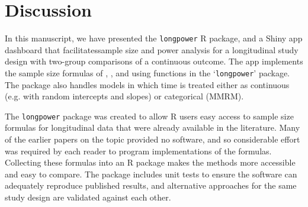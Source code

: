 \section{Discussion}
\label{sec4}
In this manuscript, we have presented the \texttt{longpower} R package, and a Shiny app dashboard that facilitatessample size and power analysis for a longitudinal study design with two-group comparisons of a continuous outcome. The app implements the sample size formulas of \cite{Liu_Liang(1997)}, \cite{Diggle_Liang_Zeger(1994),Diggle_etal(2002)}, \cite{Lu_Luo_Chen(2008)} and \cite{Edland(2009)} using functions in the `\texttt{longpower}' package. The package also handles models in which time is treated either as continuous (e.g. with random intercepts and slopes) or categorical (MMRM). 

%
%

The \texttt{longpower} package was created to allow R users easy access to sample size formulas for longitudinal data that were already available in the literature. Many of the earlier papers on the topic provided no software, and so considerable effort was required by each reader to program implementations of the formulas. Collecting these formulas into an R package makes the methods more accessible and easy to compare. The package includes unit tests to ensure the software can adequately reproduce published results, and alternative approaches for the same study design are validated against each other.

